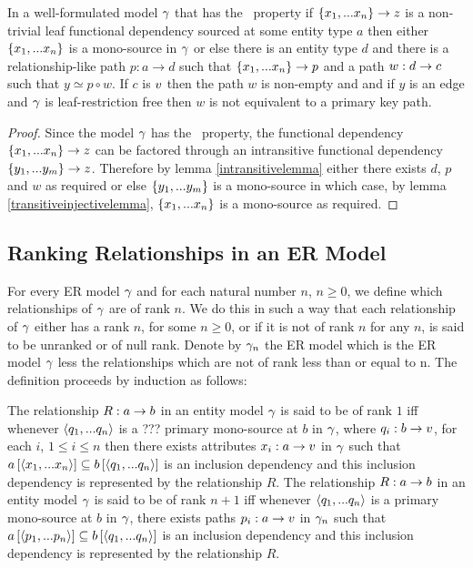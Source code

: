 \begin{lemma}
In a well-formulated model $\gamma$ that has the \fdfactoring\ property if $\left\{x_1,...x_n\right\} \rightarrow z$ is a non-trivial leaf functional dependency sourced
at some entity type $a$ then either $\left\{x_1,...x_n\right\}$ is a mono-source in $\gamma$
or else there is an entity type $d$ and there is a relationship-like path $p:a \rightarrow d$ such that $\{x_1,...x_n\} \rightarrow p$
and a  path $w:d \rightarrow c$  such that $y \simeq p \circ w$. If $c$ is $v$ then
the path $w$ is non-empty and and if $y$ is an edge and $\gamma$ is leaf-restriction free then $w$ is not equivalent to a primary key path.
\end{lemma}
\begin{proof}
Since the model $\gamma$  has the \fdfactoring\ property, the functional dependency $\left\{x_1,...x_n\right\} \rightarrow z$ can be factored through an intransitive functional
dependency $\left\{y_1,...y_m\right\} \rightarrow z$. Therefore by lemma \ref{intransitivelemma} either there exists $d$, $p$ and $w$ as required
or else  $\left\{y_1,...y_m\right\}$ is a mono-source in which case, by lemma \ref{transitiveinjectivelemma}, $\left\{x_1,...x_n\right\}$ is a mono-source as required.
\end{proof}

\subsection{Ranking Relationships in an ER Model}
For every ER model $\gamma$ and for each natural number $n$, $n \geq 0$, we define which relationships of
$\gamma$ are of rank $n$. We do this  in such a way that each relationship of $\gamma$ either has a rank $n$, for some $n \geq 0$, or if it is not of rank 
$n$ for any $n$, is said to be unranked or of null rank. Denote by $\gamma_n$ the ER model which is the ER model 
$\gamma$ less the relationships which are not of rank less than or equal to n. The definition proceeds by induction as follows:
\begin{definition}
The relationship $R: a \rightarrow b$ in an entity model $\gamma$ is said to be of rank $1$ iff whenever 
$\langle q_1,...q_n\rangle$ is a  ??? primary mono-source at $b$ in $\gamma$, where $q_i:b \rightarrow v$, for each $i$, $1 \leq i \leq n$  then there exists attributes $x_i:a \rightarrow v$ in $\gamma$ such that $a\left[\langle x_1,...x_n\rangle\right]\subseteq b\left[\langle q_1,...q_n\rangle\right]$ is an inclusion dependency and this inclusion dependency is represented by the relationship $R$. 
The relationship $R: a \rightarrow b$ in an entity model $\gamma$ is said to be of rank $n+1$ iff whenever 
$\langle q_1,...q_n\rangle$ is a primary mono-source at $b$ in $\gamma$, there exists paths $p_i:a \rightarrow v$ in $\gamma_n$ such that $a\left[\langle p_1,...p_n\rangle\right]\subseteq b\left[\langle q_1,...q_n\rangle\right]$ is an inclusion dependency and this inclusion dependency  is represented by the relationship $R$. 
\end{definition}


